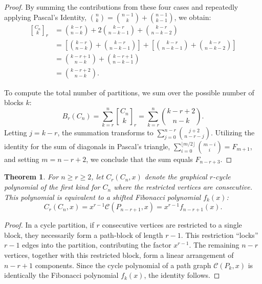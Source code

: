 \documentclass{amsart}
\newcounter{cases}
\newtheorem{theorem}{Theorem}[section]
\theoremstyle{definition}
\begin{document}
\begin{proof}
By summing the contributions from these four cases and repeatedly applying Pascal's Identity, $\binom{n}{k} = \binom{n-1}{k} + \binom{n-1}{k-1}$, we obtain:
\begin{align*}
    {C_n \brack k}_r &= \binom{k-r}{n-k} + 2\binom{k-r}{n-k-1} + \binom{k-r}{n-k-2} \\
    &= \left[ \binom{k-r}{n-k} + \binom{k-r}{n-k-1} \right] + \left[ \binom{k-r}{n-k-1} + \binom{k-r}{n-k-2} \right] \\
    &= \binom{k-r+1}{n-k} + \binom{k-r+1}{n-k-1} \\
    &= \binom{k-r+2}{n-k}.
\end{align*}

To compute the total number of partitions, we sum over the possible number of blocks $k$:
\begin{equation*}
      B_r(C_n)= \sum_{k=r}^n {C_n \brack k}_r = \sum_{k=r}^n \binom{k-r+2}{n-k}.
\end{equation*}
Letting $j = k-r$, the summation transforms to $\sum_{j=0}^{n-r} \binom{j+2}{n-r-j}$. Utilizing the identity for the sum of diagonals in Pascal's triangle, $\sum_{i=0}^{\lfloor m/2 \rfloor} \binom{m-i}{i} = F_{m+1}$, and setting $m = n-r+2$, we conclude that the sum equals $F_{n-r+3}$.
\end{proof}




\begin{theorem}
For $n \geq r \geq 2$, let $C_r(C_n, x)$ denote the graphical $r$-cycle polynomial of the first kind for $C_n$ where the restricted vertices are consecutive. This polynomial is equivalent to a shifted Fibonacci polynomial $f_k(x)$:
\begin{equation*}
    C_r(C_n, x) = x^{r-1} \mathcal{C}(P_{n-r+1}, x) = x^{r-1} f_{n-r+1}(x).
\end{equation*}
\end{theorem}

\begin{proof}
In a cycle partition, if $r$ consecutive vertices are restricted to a single block, they necessarily form a path-block of length $r-1$. This restriction ``locks'' $r-1$ edges into the partition, contributing the factor $x^{r-1}$. The remaining $n-r$ vertices, together with this restricted block, form a linear arrangement of $n-r+1$ components. Since the cycle polynomial of a path graph $\mathcal{C}(P_k, x)$ is identically the Fibonacci polynomial $f_k(x)$, the identity follows.
\end{proof}
\end{document}
